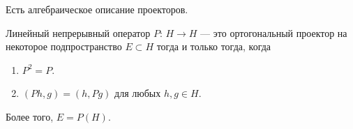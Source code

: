 \documentclass[../complex-analysis.tex]{subfiles}
\begin{document}
Есть алгебраическое описание проекторов.

\begin{thm}
 Линейный непрерывный оператор $ P \colon\,H \to H$  --- это ортогональный проектор на некоторое подпространство $ E \subset H $ тогда и только тогда, когда
 \begin{enumerate}
  \item $ P^{2} = P $.
  \item $ (Ph, g) = (h,Pg) $ для любых $ h,g \in H $.
 \end{enumerate} Более того, $ E = P(H) $.
\end{thm}
\end{document}
